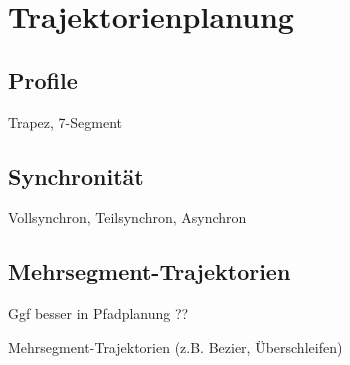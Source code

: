 \cleardoublepage


\chapter{Trajektorienplanung}


\section{Profile}

Trapez, 7-Segment


\section{Synchronität}

Vollsynchron, Teilsynchron, Asynchron


\section{Mehrsegment-Trajektorien}

Ggf besser in Pfadplanung ??

Mehrsegment-Trajektorien (z.B. Bezier, Überschleifen)
